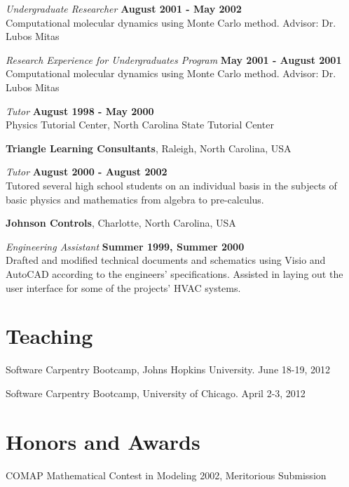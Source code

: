 \documentclass[letterpaper,margin,line]{res}
\begin{document}
\begin{resume}
{\em Undergraduate Researcher} \hfill {\bf August 2001 - May 2002}\\
Computational molecular dynamics using Monte Carlo method. Advisor: Dr. Lubos Mitas

{\em Research Experience for Undergraduates Program} \hfill {\bf May 2001 - August 2001}\\
Computational molecular dynamics using Monte Carlo method. Advisor: Dr. Lubos Mitas

{\em Tutor} \hfill {\bf August 1998 - May 2000}\\
Physics Tutorial Center, North Carolina State Tutorial Center

{\bf Triangle Learning Consultants}, Raleigh, North Carolina, USA

\vspace{-.3cm}
{\em Tutor} \hfill {\bf August 2000 - August 2002}\\
Tutored several high school students on an individual basis in the subjects of basic physics and mathematics from algebra to pre-calculus.



{\bf Johnson Controls}, Charlotte, North Carolina, USA

\vspace{-.3cm}
{\em Engineering Assistant} \hfill {\bf Summer 1999, Summer 2000}\\
Drafted and modified technical documents and schematics using Visio and AutoCAD according to the engineers' specifications. Assisted in laying out the user interface for some of the projects' HVAC systems.

\section{\sc Teaching}
Software Carpentry Bootcamp, Johns Hopkins University. June 18-19, 2012

\vspace*{-2.5mm}
Software Carpentry Bootcamp, University of Chicago. April 2-3, 2012

\section{\sc Honors and Awards} 
COMAP Mathematical Contest in Modeling 2002, Meritorious Submission


\end{resume}
\end{document}
